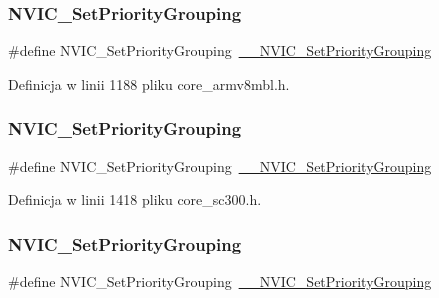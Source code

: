 \subsubsection{\texorpdfstring{N\+V\+I\+C\+\_\+\+Set\+Priority\+Grouping}{NVIC\_SetPriorityGrouping}\hspace{0.1cm}{\footnotesize\ttfamily [4/10]}}
{\footnotesize\ttfamily \#define N\+V\+I\+C\+\_\+\+Set\+Priority\+Grouping~\hyperlink{group___c_m_s_i_s___core___n_v_i_c_functions_gafc94dcbaee03e4746ade1f5bb9aaa56d}{\+\_\+\+\_\+\+N\+V\+I\+C\+\_\+\+Set\+Priority\+Grouping}}



Definicja w linii 1188 pliku core\+\_\+armv8mbl.\+h.

\mbox{\label{group___c_m_s_i_s___core___n_v_i_c_functions_ga0e798d5aec68cdd8263db86a76df788f}} 
\subsubsection{\texorpdfstring{N\+V\+I\+C\+\_\+\+Set\+Priority\+Grouping}{NVIC\_SetPriorityGrouping}\hspace{0.1cm}{\footnotesize\ttfamily [5/10]}}
{\footnotesize\ttfamily \#define N\+V\+I\+C\+\_\+\+Set\+Priority\+Grouping~\hyperlink{group___c_m_s_i_s___core___n_v_i_c_functions_gafc94dcbaee03e4746ade1f5bb9aaa56d}{\+\_\+\+\_\+\+N\+V\+I\+C\+\_\+\+Set\+Priority\+Grouping}}



Definicja w linii 1418 pliku core\+\_\+sc300.\+h.

\mbox{\label{group___c_m_s_i_s___core___n_v_i_c_functions_ga0e798d5aec68cdd8263db86a76df788f}} 
\subsubsection{\texorpdfstring{N\+V\+I\+C\+\_\+\+Set\+Priority\+Grouping}{NVIC\_SetPriorityGrouping}\hspace{0.1cm}{\footnotesize\ttfamily [6/10]}}
{\footnotesize\ttfamily \#define N\+V\+I\+C\+\_\+\+Set\+Priority\+Grouping~\hyperlink{group___c_m_s_i_s___core___n_v_i_c_functions_gafc94dcbaee03e4746ade1f5bb9aaa56d}{\+\_\+\+\_\+\+N\+V\+I\+C\+\_\+\+Set\+Priority\+Grouping}}




